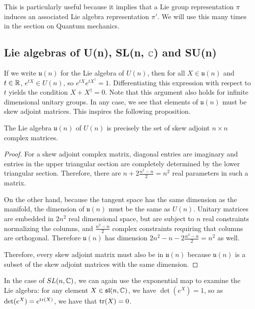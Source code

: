 \documentclass[a4paper]{article}
\begin{document}
This is particularly useful because it implies that a Lie group representation $\pi$ induces an associated Lie algebra representation $\pi'$. We will use this many times in the section on Quantum mechanics.

\subsection{Lie algebras of U(n), SL(n, \texorpdfstring{$\mathbb{C}$}{C}) and SU(n)}

If we write $\mathfrak{u}(n)$ for the Lie algebra of $U(n)$, then for all $X \in \mathfrak{u}(n)$ and $t \in \mathbb{R}$, $e^{tX} \in U(n)$, so $e^{tX}e^{tX^\dagger} = 1$. Differentiating this expression with respect to $t$ yields the condition $X + X^\dagger = 0$. Note that this argument also holds for infinite dimensional unitary groups. In any case, we see that elements of $\mathfrak{u}(n)$ must be skew adjoint matrices. This inspires the following proposition. 

\begin{prop}
    The Lie algebra $\mathfrak{u}(n)$ of $U(n)$ is precisely the set of skew adjoint $n \times n$ complex matrices.
\end{prop}

\begin{proof}
    For a skew adjoint complex matrix, diagonal entries are imaginary and entries in the upper triangular section are completely determined by the lower triangular section. Therefore, there are $n + 2 \frac{n^2 - n }{2} = n^2$ real parameters in such a matrix.

    On the other hand, because the tangent space has the same dimension as the manifold, the dimension of $\mathfrak{u}(n)$ must be the same as $U(n)$. Unitary matrices are embedded in $2n^2$ real dimensional space, but are subject to $n$ real constraints normalizing the columns, and $\frac{n^2 - n }{2}$ complex constraints requiring that columns are orthogonal. Therefore $\mathfrak{u}(n)$ has dimension $2n^2 - n - 2 \frac{n^2 - n }{2} = n^2$ as well. 
    
    Therefore, every skew adjoint matrix must also be in $\mathfrak{u}(n)$ because $\mathfrak{u}(n)$ is a subset of the skew adjoint matrices with the same dimension.
\end{proof}

In the case of $SL(n, \mathbb{C})$, we can again use the exponential map to examine the Lie algebra: for any element $X \in \mathfrak{sl}(n, \mathbb{C})$, we have $\det(e^X) = 1$, so as $\det(e^X) = e^{\operatorname{tr}(X)}$, we have that $\operatorname{tr}(X) = 0$. 
\end{document}
